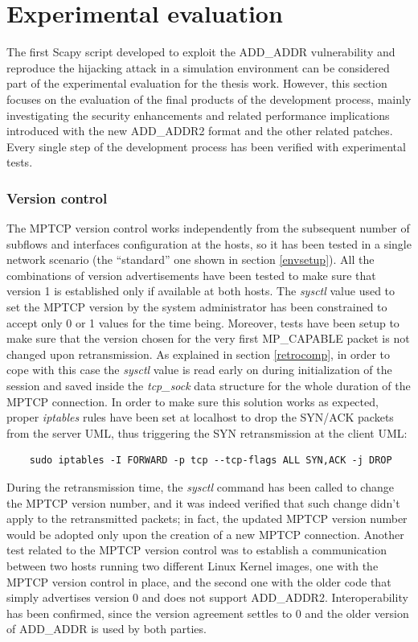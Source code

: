 \section{Experimental evaluation}
\label{exp}
The first Scapy script developed to exploit the ADD\_ADDR vulnerability and reproduce the hijacking attack in a simulation environment can be considered part of the experimental evaluation for the thesis work. However, this section focuses on the evaluation of the final products of the development process, mainly investigating the security enhancements and related performance implications introduced with the new ADD\_ADDR2 format and the other related patches.
Every single step of the development process has been verified with experimental tests.

\subsubsection{Version control}
The MPTCP version control works independently from the subsequent number of subflows and interfaces configuration at the hosts, so it has been tested in a single network scenario (the ``standard'' one shown in section \ref{envsetup}). All the combinations of version advertisements have been tested to make sure that version 1 is established only if available at both hosts. The \textit{sysctl} value used to set the MPTCP version by the system administrator has been constrained to accept only 0 or 1 values for the time being. Moreover, tests have been setup to make sure that the version chosen for the very first MP\_CAPABLE packet is not changed upon retransmission. As explained in section \ref{retrocomp}, in order to cope with this case the \textit{sysctl} value is read early on during initialization of the session and saved inside the \textit{tcp\_sock} data structure for the whole duration of the MPTCP connection. In order to make sure this solution works as expected, proper \textit{iptables} rules have been set at localhost to drop the SYN/ACK packets from the server UML, thus triggering the SYN retransmission at the client UML: 

\begin{verbatim}
	sudo iptables -I FORWARD -p tcp --tcp-flags ALL SYN,ACK -j DROP
\end{verbatim}

During the retransmission time, the \textit{sysctl} command has been called to change the MPTCP version number, and it was indeed verified that such change didn't apply to the retransmitted packets; in fact, the updated MPTCP version number would be adopted only upon the creation of a new MPTCP connection. 
Another test related to the MPTCP version control was to establish a communication between two hosts running two different Linux Kernel images, one with the MPTCP version control in place, and the second one with the older code that simply advertises version 0 and does not support ADD\_ADDR2. Interoperability has been confirmed, since the version agreement settles to 0 and the older version of ADD\_ADDR is used by both parties.


